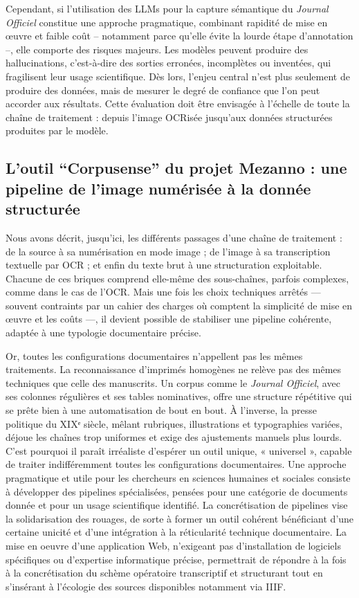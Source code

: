 Cependant, si l’utilisation des LLMs pour la capture sémantique du \emph{Journal Officiel} constitue une approche pragmatique, combinant rapidité de mise en œuvre et faible coût – notamment parce qu’elle évite la lourde étape d’annotation –, elle comporte des risques majeurs. Les modèles peuvent produire des hallucinations, c’est-à-dire des sorties erronées, incomplètes ou inventées, qui fragilisent leur usage scientifique. Dès lors, l’enjeu central n’est plus seulement de produire des données, mais de mesurer le degré de confiance que l’on peut accorder aux résultats. Cette évaluation doit être envisagée à l’échelle de toute la chaîne de traitement : depuis l’image OCRisée jusqu’aux données structurées produites par le modèle.

\subsection{L'outil \enquote{Corpusense} du projet Mezanno : une pipeline de l'image numérisée à la donnée structurée}

Nous avons décrit, jusqu’ici, les différents passages d’une chaîne de traitement : de la source à sa numérisation en mode image ; de l’image à sa transcription textuelle par OCR ; et enfin du texte brut à une structuration exploitable. Chacune de ces briques comprend elle-même des sous-chaînes, parfois complexes, comme dans le cas de l’OCR. Mais une fois les choix techniques arrêtés — souvent contraints par un cahier des charges où comptent la simplicité de mise en œuvre et les coûts —, il devient possible de stabiliser une pipeline cohérente, adaptée à une typologie documentaire précise.

Or, toutes les configurations documentaires n’appellent pas les mêmes traitements. La reconnaissance d’imprimés homogènes ne relève pas des mêmes techniques que celle des manuscrits. Un corpus comme le \emph{Journal Officiel}, avec ses colonnes régulières et ses tables nominatives, offre une structure répétitive qui se prête bien à une automatisation de bout en bout. À l’inverse, la presse politique du XIXᵉ siècle, mêlant rubriques, illustrations et typographies variées, déjoue les chaînes trop uniformes et exige des ajustements manuels plus lourds. C’est pourquoi il paraît irréaliste d’espérer un outil unique, « universel », capable de traiter indifféremment toutes les configurations documentaires. Une approche pragmatique et utile pour les chercheurs en sciences humaines et sociales consiste à développer des pipelines spécialisées, pensées pour une catégorie de documents donnée et pour un usage scientifique identifié. La concrétisation de pipelines vise la solidarisation des rouages, de sorte à former un outil cohérent bénéficiant d'une certaine unicité et d'une intégration à la réticularité technique documentaire. La mise en oeuvre d'une application Web, n'exigeant pas d'installation de logiciels spécifiques ou d'expertise informatique précise, permettrait de répondre à la fois à la concrétisation du schème opératoire transcriptif et structurant tout en s'insérant à l'écologie des sources disponibles notamment via IIIF.

